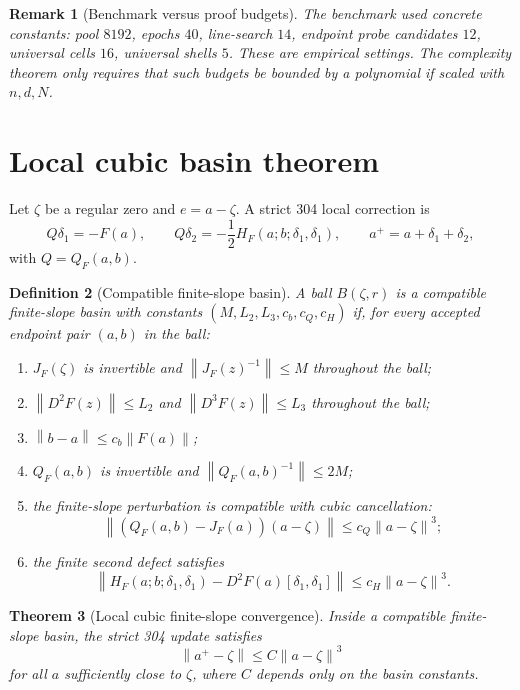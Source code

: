 \documentclass[11pt]{article}
\newtheorem{definition}{Definition}[section]
\newtheorem{theorem}[definition]{Theorem}
\newtheorem{remark}[definition]{Remark}
\newcommand{\norm}[1]{\left\lVert #1\right\rVert}
\begin{document}
\begin{remark}[Benchmark versus proof budgets]
The benchmark used concrete constants: pool $8192$, epochs $40$, line-search $14$, endpoint probe candidates $12$, universal cells $16$, universal shells $5$.  These are empirical settings.  The complexity theorem only requires that such budgets be bounded by a polynomial if scaled with $n,d,N$.
\end{remark}

\section{Local cubic basin theorem}

Let $\zeta$ be a regular zero and $e=a-\zeta$.  A strict 304 local correction is
\[
        Q\delta_1=-F(a),\qquad
        Q\delta_2=-\frac12H_F(a;b;\delta_1,\delta_1),\qquad
        a^+=a+\delta_1+\delta_2,
\]
with $Q=Q_F(a,b)$.

\begin{definition}[Compatible finite-slope basin]\label{def:basin}
A ball $B(\zeta,r)$ is a compatible finite-slope basin with constants $(M,L_2,L_3,c_b,c_Q,c_H)$ if, for every accepted endpoint pair $(a,b)$ in the ball:
\begin{enumerate}[label=(\roman*)]
\item $J_F(\zeta)$ is invertible and $\norm{J_F(z)^{-1}}\le M$ throughout the ball;
\item $\norm{D^2F(z)}\le L_2$ and $\norm{D^3F(z)}\le L_3$ throughout the ball;
\item $\norm{b-a}\le c_b\norm{F(a)}$;
\item $Q_F(a,b)$ is invertible and $\norm{Q_F(a,b)^{-1}}\le2M$;
\item the finite-slope perturbation is compatible with cubic cancellation:
\[
        \norm{(Q_F(a,b)-J_F(a))(a-\zeta)}\le c_Q\norm{a-\zeta}^3;
\]
\item the finite second defect satisfies
\[
        \norm{H_F(a;b;\delta_1,\delta_1)-D^2F(a)[\delta_1,\delta_1]}
        \le c_H\norm{a-\zeta}^3.
\]
\end{enumerate}
\end{definition}

\begin{theorem}[Local cubic finite-slope convergence]\label{thm:local-cubic}
Inside a compatible finite-slope basin, the strict 304 update satisfies
\[
        \norm{a^+-\zeta}\le C\norm{a-\zeta}^3
\]
for all $a$ sufficiently close to $\zeta$, where $C$ depends only on the basin constants.
\end{theorem}
\end{document}
